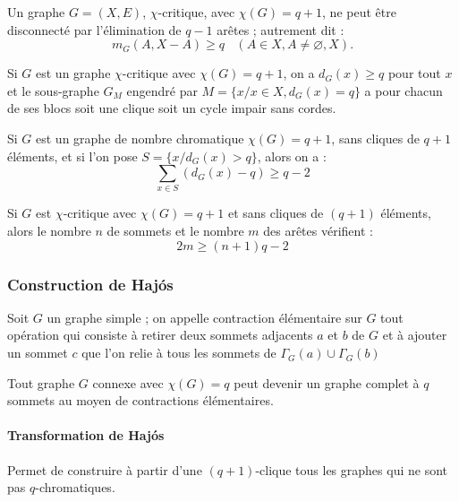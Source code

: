 \begin{prop}
Un graphe $G=(X,E)$, $\chi$-critique, avec $\chi(G)=q+1$, ne peut être disconnecté par l'élimination
de $q-1$ arêtes ; autrement dit :
$$m_G(A,X-A)\geq q\ \ \ \ (A\in X, A \neq \varnothing,X).$$
\end{prop}

\begin{theorem}
Si $G$ est un graphe $\chi$-critique avec $\chi(G)=q+1$, on a $d_G(x)\geq q$ pour tout $x$ et
le sous-graphe $G_M$ engendré par $M=\{x/x\in X, d_G(x)=q\}$ a pour chacun de ses blocs soit une clique
soit un cycle impair sans cordes.
\end{theorem}

\begin{theorem}[Dirac, 1952]
Si $G$ est un graphe de nombre chromatique $\chi(G)=q+1$, sans cliques de $q+1$ éléments, et
si l'on pose $S=\{x / d_G(x)>q\}$, alors on a :
$$\sum_{x \in S} (d_G(x)-q) \geq q-2$$
\end{theorem}

\begin{corollaire}
Si $G$ est $\chi$-critique avec $\chi(G)=q+1$ et sans cliques de $(q+1)$ éléments, alors le nombre $n$
de sommets et le nombre $m$ des arêtes vérifient :
$$2m\geq (n+1)q-2$$
\end{corollaire}
\setcounter{corollaire}{0}

\subsubsection{Construction de Haj\'{o}s}
\begin{defin}
Soit $G$ un graphe simple ; on appelle contraction élémentaire sur $G$ tout opération qui
consiste à retirer deux sommets adjacents $a$ et $b$ de $G$ et à ajouter un sommet $c$ que
l'on relie à tous les sommets de $\Gamma_G(a)\cup\Gamma_G(b)$
\end{defin}

\begin{conj}[Hadwiger, 1943]
Tout graphe $G$ connexe avec $\chi(G)=q$ peut devenir un graphe complet à $q$ sommets au
moyen de contractions élémentaires.
\end{conj}

\paragraph{Transformation de Haj\'{o}s}$ $\\
Permet de construire à partir d'une $(q+1)$-clique tous les graphes qui ne sont pas $q$-chromatiques.

